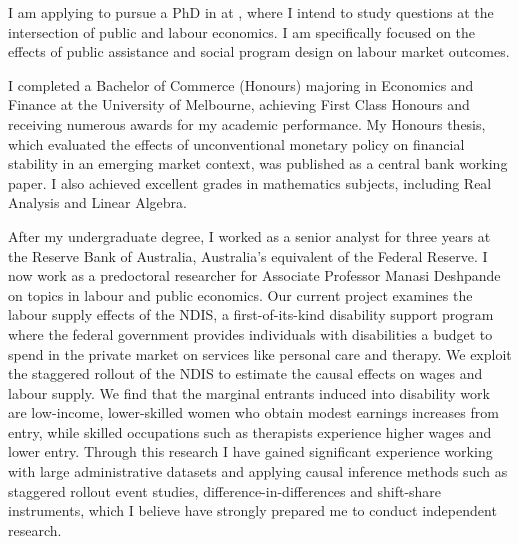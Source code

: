  I am applying to pursue a PhD in \program{} at \school, where I intend to study questions at the intersection of public and labour economics. I am specifically focused on the effects of public assistance and social program design on labour market outcomes.

 I completed a Bachelor of Commerce (Honours) majoring in Economics and Finance at the University of Melbourne, achieving First Class Honours and receiving numerous awards for my academic performance. My Honours thesis, which evaluated the effects of unconventional monetary policy on financial stability in an emerging market context, was published as a central bank working paper. I also achieved excellent grades in mathematics subjects, including Real Analysis and Linear Algebra.

 After my undergraduate degree, I worked as a senior analyst for three years at the Reserve Bank of Australia, Australia's equivalent of the Federal Reserve. I now work as a predoctoral researcher for Associate Professor Manasi Deshpande on topics in labour and public economics. Our current project examines the labour supply effects of the NDIS, a first-of-its-kind disability support program where the federal government provides individuals with disabilities a budget to spend in the private market on services like personal care and therapy. We exploit the staggered rollout of the NDIS to estimate the causal effects on wages and labour supply. We find that the marginal entrants induced into disability work are low-income, lower-skilled women who obtain modest earnings increases from entry, while skilled occupations such as therapists experience higher wages and lower entry. Through this research I have gained significant experience working with large administrative datasets and applying causal inference methods such as staggered rollout event studies, difference-in-differences and shift-share instruments, which I believe have strongly prepared me to conduct independent research.

